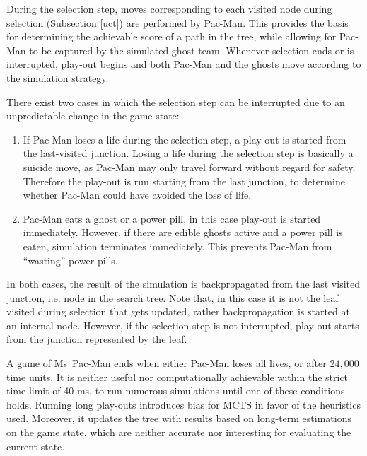 \documentclass[journal]{IEEEtran}
\begin{document}
During the selection step, moves corresponding to each visited node during selection (Subsection \ref{uct}) are performed by Pac-Man. This provides the basis for determining the achievable score of a path in the tree, while allowing for Pac-Man to be captured by the simulated ghost team. Whenever selection ends or is interrupted, play-out begins and both Pac-Man and the ghosts move according to the simulation strategy.

There exist two cases in which the selection step can be interrupted due to an unpredictable change in the game state:
\begin{enumerate}
\item If Pac-Man loses a life during the selection step, a play-out is started from the last-visited junction. Losing a life during the selection step is basically a suicide move, as Pac-Man may only travel forward without regard for safety. Therefore the play-out is run starting from the last junction, to determine whether Pac-Man could have avoided the loss of life. 
\item Pac-Man eats a ghost or a power pill, in this case play-out is started immediately. However, if there are edible ghosts active and a power pill is eaten, simulation terminates immediately. This prevents Pac-Man from ``wasting'' power pills.
\end{enumerate}
In both cases, the result of the simulation is backpropagated from the last visited junction, i.e. node in the search tree. Note that, in this case it is not the leaf visited during selection that gets updated, rather backpropagation is started at an internal node. However, if the selection step is not interrupted, play-out starts from the junction represented by the leaf.

A game of Ms~Pac-Man ends when either Pac-Man loses all lives, or after $24,000$ time units. It is neither useful nor computationally achievable within the strict time limit of 40 ms. to run numerous simulations until one of these conditions holds. Running long play-outs introduces bias for MCTS in favor of the heuristics used. Moreover, it updates the tree with results based on long-term estimations on the game state, which are neither accurate nor interesting for evaluating the current state.
\end{document}

